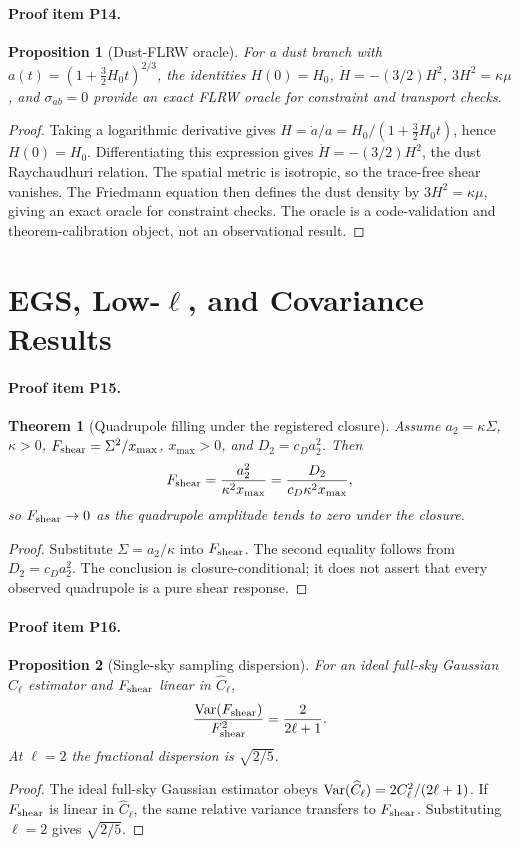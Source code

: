 \documentclass[11pt]{article}
\newtheorem{proposition}{Proposition}
\newtheorem{theorem}{Theorem}
\begin{document}
\paragraph{Proof item P14.}
\begin{proposition}[Dust-FLRW oracle]
For a dust branch with \(a(t)=(1+\tfrac32H_0t)^{2/3}\), the identities \(H(0)=H_0\), \(\dot H=-(3/2)H^2\), \(3H^2=\kappa\mu\), and \(\sigma_{ab}=0\) provide an exact FLRW oracle for constraint and transport checks.
\end{proposition}
\begin{proof}
Taking a logarithmic derivative gives \(H=\dot a/a=H_0/(1+\tfrac32H_0t)\), hence \(H(0)=H_0\).  Differentiating this expression gives \(\dot H=-(3/2)H^2\), the dust Raychaudhuri relation.  The spatial metric is isotropic, so the trace-free shear vanishes.  The Friedmann equation then defines the dust density by \(3H^2=\kappa\mu\), giving an exact oracle for constraint checks.  The oracle is a code-validation and theorem-calibration object, not an observational result.
\end{proof}

\section{EGS, Low-\(\ell\), and Covariance Results}
\paragraph{Proof item P15.}
\begin{theorem}[Quadrupole filling under the registered closure]
Assume \(a_2=\kappa\Sigma\), \(\kappa>0\), \(F_{\rm shear}=\Sigma^2/x_{\max}\), \(x_{\max}>0\), and \(D_2=c_D a_2^2\).  Then
\[
  F_{\rm shear}
  =
  \frac{a_2^2}{\kappa^2x_{\max}}
  =
  \frac{D_2}{c_D\kappa^2x_{\max}},
\]
so \(F_{\rm shear}\to0\) as the quadrupole amplitude tends to zero under the closure.
\end{theorem}
\begin{proof}
Substitute \(\Sigma=a_2/\kappa\) into \(F_{\rm shear}\).  The second equality follows from \(D_2=c_Da_2^2\).  The conclusion is closure-conditional; it does not assert that every observed quadrupole is a pure shear response.
\end{proof}

\paragraph{Proof item P16.}
\begin{proposition}[Single-sky sampling dispersion]
For an ideal full-sky Gaussian \(C_\ell\) estimator and \(F_{\rm shear}\) linear in \(\widehat C_\ell\),
\[
  \frac{{\rm Var}(F_{\rm shear})}{F_{\rm shear}^2}=\frac{2}{2\ell+1}.
\]
At \(\ell=2\) the fractional dispersion is \(\sqrt{2/5}\).
\end{proposition}
\begin{proof}
The ideal full-sky Gaussian estimator obeys \({\rm Var}(\widehat C_\ell)=2C_\ell^2/(2\ell+1)\).  If \(F_{\rm shear}\) is linear in \(\widehat C_\ell\), the same relative variance transfers to \(F_{\rm shear}\).  Substituting \(\ell=2\) gives \(\sqrt{2/5}\).
\end{proof}
\end{document}
